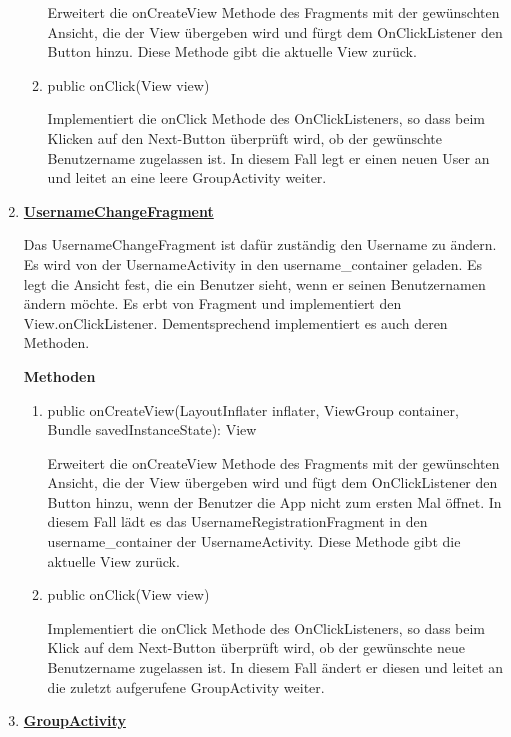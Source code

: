 \begin{enumerate}
\begin{enumerate}
		Erweitert die onCreateView Methode des Fragments mit der gewünschten Ansicht, die der View übergeben wird und fürgt dem OnClickListener den Button hinzu. Diese Methode gibt die aktuelle View zurück.
		
		\item public onClick(View view)

		Implementiert die onClick Methode des OnClickListeners, so dass beim Klicken auf den Next-Button überprüft wird, ob der gewünschte Benutzername zugelassen ist. In diesem Fall legt er einen neuen User an und leitet an eine leere GroupActivity weiter.
	\end{enumerate}

	\item \textbf{\underline{UsernameChangeFragment}}
		
	Das UsernameChangeFragment ist dafür zuständig den Username zu ändern. Es wird von der UsernameActivity in den username\_container geladen. Es legt die Ansicht fest, die ein Benutzer sieht, wenn er seinen Benutzernamen ändern möchte. Es erbt von Fragment und implementiert den View.onClickListener. Dementsprechend implementiert es auch deren Methoden.
	
	\textbf{Methoden}
	
	\begin{enumerate}
		\item public onCreateView(LayoutInflater inflater, ViewGroup container, Bundle savedInstanceState): View
		
		Erweitert die onCreateView Methode des Fragments mit der gewünschten Ansicht, die der View übergeben wird und fügt dem OnClickListener den Button hinzu, wenn der Benutzer die App nicht zum ersten Mal öffnet. In diesem Fall lädt es das UsernameRegistrationFragment in den username\_container der UsernameActivity. Diese Methode gibt die aktuelle View zurück.
		
		\item public onClick(View view)
		
		Implementiert die onClick Methode des OnClickListeners, so dass beim Klick auf dem Next-Button überprüft wird, ob der gewünschte neue Benutzername zugelassen ist. In diesem Fall ändert er diesen und leitet an die zuletzt aufgerufene GroupActivity weiter.
	\end{enumerate}
	
	\item \textbf{\underline{GroupActivity}}
	

\end{enumerate}
